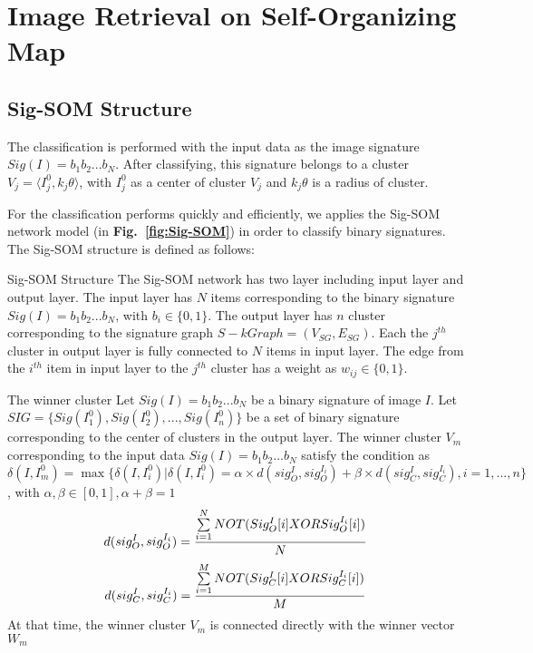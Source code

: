 \documentclass{amcs}
\begin{document}
\section{Image Retrieval on Self-Organizing Map}
\label{Sig-SOM}
\subsection{Sig-SOM Structure} 
The classification is performed with the input data as the image signature $Sig(I) = {b_1}{b_2}...{b_N}$. After classifying, this signature belongs to a cluster ${V_j} = \langle I_j^0,{k_j}\theta \rangle $, with $I_j^0$ as a center of cluster ${V_j}$ and ${k_j}\theta $ is a radius of cluster.

For the classification performs quickly and efficiently, we applies the Sig-SOM network model (in \textbf{Fig.~\ref{fig:Sig-SOM}}) in order to classify binary signatures. The Sig-SOM structure is defined as follows:

\begin{definition}{Sig-SOM Structure} The Sig-SOM network has two layer including input layer and output layer. The input layer has $N$ items corresponding to the binary signature $Sig(I) = {b_1}{b_2}...{b_N}$, with ${b_i} \in \{ 0,1\} $. The output layer has $n$ cluster corresponding to the signature graph $S - kGraph = ({V_{SG}},{E_{SG}})$. Each the ${j^{th}}$ cluster in output layer is fully connected to $N$ items in input layer. The edge from the ${i^{th}}$ item in input layer to the  ${j^{th}}$ cluster has a weight as ${w_{ij}} \in \{ 0,1\}$.
\end{definition}

\begin{definition}{The winner cluster} Let $Sig(I) = {b_1}{b_2}...{b_N}$ be a binary signature of image $I$. Let $SIG = \{ Sig(I_1^0),Sig(I_2^0),...,Sig(I_n^0)\}$ be a set of binary signature corresponding to the center of clusters in the output layer. The winner cluster ${V_m}$ corresponding to the input data $Sig(I) = {b_1}{b_2}...{b_N}$ satisfy the condition as $\delta (I,I_m^0) = \max \{ \delta (I,I_i^0)|\delta (I,I_i^0) = \alpha  \times d(sig_O^I,sig_O^{{I_i}}) + \beta  \times d(sig_C^I,sig_C^{{I_i}}),i = 1,...,n\}$, with $\alpha ,\beta  \in [0,1],\alpha  + \beta  = 1$
\begin{equation}
\small d(sig_O^I,sig_O^{{I_i}}) = \frac{{\sum\limits_{i = 1}^N {NOT(Sig_O^I[i]{\rm{ }}XOR{\rm{ }}Sig_O^{{I_i}}[i])} }}{N}
\label{eq:dO}
\end{equation}
\begin{equation}
\small d(sig_C^I,sig_C^{{I_i}}) \\= \frac{{\sum\limits_{i = 1}^M {NOT(Sig_C^I[i]{\rm{ }}XOR{\rm{ }}Sig_C^{{I_i}}[i])} }}{M}
\label{eq:dI}
\end{equation}
At that time, the winner cluster ${V_m}$ is connected directly with the winner vector ${W_m}$
\label{def:winner-cluster}
\end{definition}
\end{document}
